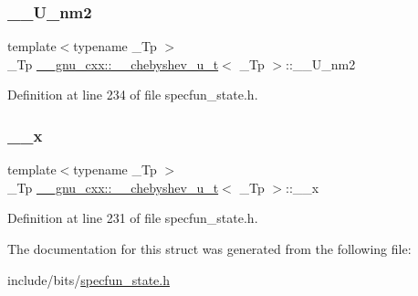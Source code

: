 \subsubsection{\texorpdfstring{\+\_\+\+\_\+\+U\+\_\+nm2}{\_\_U\_nm2}}
{\footnotesize\ttfamily template$<$typename \+\_\+\+Tp $>$ \\
\+\_\+\+Tp \hyperlink{struct____gnu__cxx_1_1____chebyshev__u__t}{\+\_\+\+\_\+gnu\+\_\+cxx\+::\+\_\+\+\_\+chebyshev\+\_\+u\+\_\+t}$<$ \+\_\+\+Tp $>$\+::\+\_\+\+\_\+\+U\+\_\+nm2}



Definition at line 234 of file specfun\+\_\+state.\+h.

\mbox{\label{struct____gnu__cxx_1_1____chebyshev__u__t_a038c998d409d5fb0404df67afb9b217c}} 
\subsubsection{\texorpdfstring{\+\_\+\+\_\+x}{\_\_x}}
{\footnotesize\ttfamily template$<$typename \+\_\+\+Tp $>$ \\
\+\_\+\+Tp \hyperlink{struct____gnu__cxx_1_1____chebyshev__u__t}{\+\_\+\+\_\+gnu\+\_\+cxx\+::\+\_\+\+\_\+chebyshev\+\_\+u\+\_\+t}$<$ \+\_\+\+Tp $>$\+::\+\_\+\+\_\+x}



Definition at line 231 of file specfun\+\_\+state.\+h.



The documentation for this struct was generated from the following file\+:\begin{DoxyCompactItemize}
\item 
include/bits/\hyperlink{specfun__state_8h}{specfun\+\_\+state.\+h}\end{DoxyCompactItemize}
